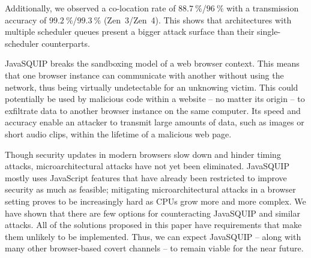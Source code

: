 \documentclass[11pt,
  titlepage=false,
  parskip=half,      %
]{scrreprt}
\begin{document}
Additionally, we observed a co-location rate of $88.7~\%$/$96~\%$ with a transmission accuracy of $99.2~\%$/$99.3~\%$ (Zen~3/Zen~4).
This shows that architectures with multiple scheduler queues present a bigger attack surface than their single-scheduler counterparts.

JavaSQUIP breaks the sandboxing model of a web browser context.
This means that one browser instance can communicate with another without using the network, thus being virtually undetectable for an unknowing victim.
This could potentially be used by malicious code within a website -- no matter its origin -- to exfiltrate data to another browser instance on the same computer.
Its speed and accuracy enable an attacker to transmit large amounts of data, such as images or short audio clips, within the lifetime of a malicious web page.

Though security updates in modern browsers slow down and hinder timing attacks, microarchitectural attacks have not yet been eliminated.
JavaSQUIP mostly uses JavaScript features that have already been restricted to improve security as much as feasible;
mitigating microarchitectural attacks in a browser setting proves to be increasingly hard as CPUs grow more and more complex.
We have shown that there are few options for counteracting JavaSQUIP and similar attacks.
All of the solutions proposed in this paper have requirements that make them unlikely to be implemented.
Thus, we can expect JavaSQUIP -- along with many other browser-based covert channels --
to remain viable for the near future.

\pagebreak
\printbibliography
\end{document}
